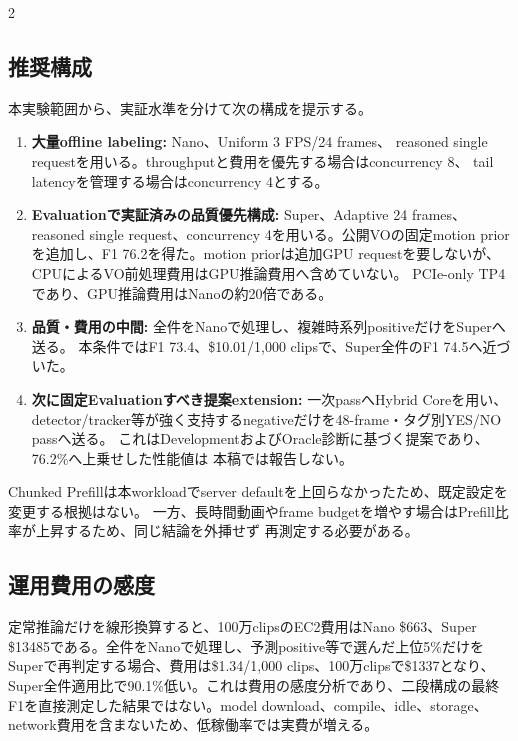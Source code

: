 \documentclass[9pt,a4paper]{extarticle}
\begin{document}
\begin{multicols}{2}
\subsection{推奨構成}
本実験範囲から、実証水準を分けて次の構成を提示する。
\begin{enumerate}
  \item \textbf{大量offline labeling:} Nano、Uniform 3 FPS/24 frames、
        reasoned single requestを用いる。throughputと費用を優先する場合はconcurrency 8、
        tail latencyを管理する場合はconcurrency 4とする。
  \item \textbf{Evaluationで実証済みの品質優先構成:} Super、Adaptive 24 frames、
        reasoned single request、concurrency 4を用いる。公開VOの固定motion priorを追加し、F1 76.2を得た。motion priorは追加GPU requestを要しないが、CPUによるVO前処理費用はGPU推論費用へ含めていない。
        PCIe-only TP4であり、GPU推論費用はNanoの約20倍である。
  \item \textbf{品質・費用の中間:} 全件をNanoで処理し、複雑時系列positiveだけをSuperへ送る。
        本条件ではF1 73.4、\$10.01/1,000 clipsで、Super全件のF1 74.5へ近づいた。
  \item \textbf{次に固定Evaluationすべき提案extension:} 一次passへHybrid Coreを用い、
        detector/tracker等が強く支持するnegativeだけを48-frame・タグ別YES/NO passへ送る。
        これはDevelopmentおよびOracle診断に基づく提案であり、76.2\%へ上乗せした性能値は
        本稿では報告しない。
\end{enumerate}
Chunked Prefillは本workloadでserver defaultを上回らなかったため、既定設定を変更する根拠はない。
一方、長時間動画やframe budgetを増やす場合はPrefill比率が上昇するため、同じ結論を外挿せず
再測定する必要がある。

\subsection{運用費用の感度}
定常推論だけを線形換算すると、100万clipsのEC2費用はNano \$663、Super \$13485である。全件をNanoで処理し、予測positive等で選んだ上位5\%だけをSuperで再判定する場合、費用は\$1.34/1,000 clips、100万clipsで\$1337となり、Super全件適用比で90.1\%低い。これは費用の感度分析であり、二段構成の最終F1を直接測定した結果ではない。model download、compile、idle、storage、network費用を含まないため、低稼働率では実費が増える。


\end{multicols}
\end{document}
